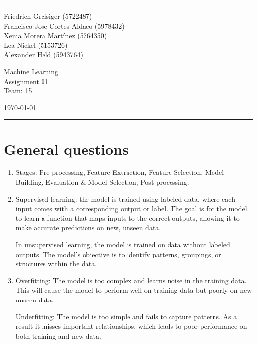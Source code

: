 \documentclass[a4paper]{article}
\begin{document}
\fancyhead[C]{}
\hrule \medskip
\begin{minipage}{0.295\textwidth} 
\raggedright
\footnotesize
Friedrich Greisiger (5722487)\hfill\\
Francisco Jose Cortes Aldaco (5978432)\hfill\\ 
Xenia Morera Martínez (5364350)\hfill\\
Lea Nickel (5153726)\hfill\\ 
Alexander Held (5943764)\hfill\\ 
\end{minipage}
\begin{minipage}{0.4\textwidth} 
\centering
\normalsize 
Machine Learning\\
\large 
Assignment 01\\ 
\normalsize 
Team: 15\\ 
\end{minipage}
\begin{minipage}{0.295\textwidth} 
\raggedleft
\today\hfill\\
\end{minipage}
\medskip\hrule 
\bigskip


\section{General questions}
\begin{enumerate}
    \item 
    Stages: Pre-processing, Feature Extraction, Feature Selection, Model Building, Evaluation \& Model Selection, Post-processing.
    \item 
    Supervised learning: the model is trained using labeled data, where each input comes with a corresponding output or label. The goal is for the model to learn a function that maps inputs to the correct outputs, allowing it to make accurate predictions on new, unseen data.
    
    In unsupervised learning, the model is trained on data without labeled outputs. The model’s objective is to identify patterns, groupings, or structures within the data.
    \item 
    Overfitting: The model is too complex and learns noise in the training data. This will cause the model to perform well on training data but poorly on new unseen data.
    
    Underfitting: The model is too simple and fails to capture patterns. As a result it misses important relationships, which leads to poor performance on both training and new data.
\end{enumerate}
\end{document}
